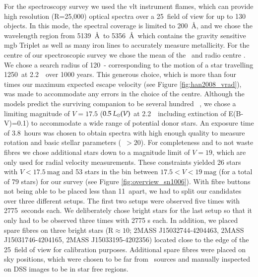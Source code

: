 For the spectroscopy survey we used the \gls{vlt} instrument \gls{flames}, which can provide high resolution (R=25,000) optical spectra over a 25\arcmin\ field of view for up to 130 objects. In this mode, the spectral coverage is limited to 200~\AA, and we chose the wavelength region from 5139~\AA\ to 5356~\AA\ which contains the gravity sensitive \gls{mgb} Triplet as well as many iron lines to accurately measure metallicity. For the centre of our spectroscopic survey we chose the mean of the \xray\ and radio centre \citep[\ ;][]{2003ApJ...585..324W}. We chose a search radius of 120\arcsec\ - corresponding to the motion of a star travelling 1250~\kms at 2.2~\kpc\ over 1000 years. This generous choice, which is more than four times our maximum expected escape velocity (see Figure \vref{fig:han2008_vrad}), was made to accommodate any errors in the choice of the centre. Although the models predict the surviving companion to be several hundred \lsun\ \citep{2000ApJS..128..615M}, we chose a limiting magnitude of $V=17.5$ ($0.5~\hbox{$L_{\odot}$}(V)$ at 2.2~\kpc\ including extinction of E(B-V)=0.1) to accommodate a wide range of potential \gls{donor} stars. An exposure time of 3.8~hours was chosen to obtain spectra with high enough quality to measure rotation and basic stellar parameters (\snratio\ $>20$). For completeness and to not waste fibres we chose additional stars down to a magnitude limit of $V=19$, which are only used for radial velocity measurements. These constraints yielded 26 stars with $V<17.5~\textrm{mag}$ and 53 stars in the bin between $17.5<V<19~\textrm{mag}$ (for a total of 79 stars) for our survey (see Figure \ref{fig:overview_sn1006}). With fibre buttons not being able to be placed less than 11\arcsec\ apart, we had to split our candidates over three different setups. The first two setups were observed five times with 2775~seconds each. We deliberately chose bright stars for the last setup so that it only had to be observed three times with 2775 s each. In addition, we placed spare fibres on three bright stars (R$\approx 10$; 2MASS J15032744-4204463, 2MASS J15031746-4204165, 2MASS J15033195-4202356) located close to the edge of the 25\arcmin\ field of view for calibration purposes. Additional spare fibres were placed on sky positions, which were chosen to be far from \twomass\ sources and manually inspected on DSS images to be in star free regions.

